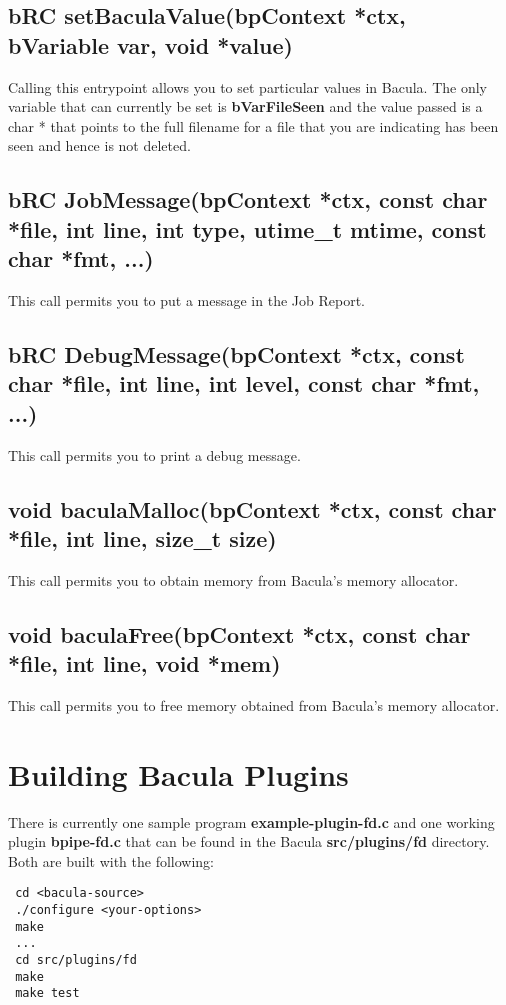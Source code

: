 \subsection{bRC setBaculaValue(bpContext *ctx, bVariable var, void *value)}
Calling this entrypoint allows you to set particular values in
Bacula. The only variable that can currently be set is
{\bf bVarFileSeen} and the value passed is a char * that points
to the full filename for a file that you are indicating has been
seen and hence is not deleted.

\subsection{bRC JobMessage(bpContext *ctx, const char *file, int line,
       int type, utime\_t mtime, const char *fmt, ...)}
This call permits you to put a message in the Job Report.


\subsection{bRC DebugMessage(bpContext *ctx, const char *file, int line,
       int level, const char *fmt, ...)}
This call permits you to print a debug message.


\subsection{void baculaMalloc(bpContext *ctx, const char *file, int line,
       size\_t size)}
This call permits you to obtain memory from Bacula's memory allocator.


\subsection{void baculaFree(bpContext *ctx, const char *file, int line, void *mem)}
This call permits you to free memory obtained from Bacula's memory allocator.

\section{Building Bacula Plugins}
There is currently one sample program {\bf example-plugin-fd.c} and
one working plugin {\bf bpipe-fd.c} that can be found in the Bacula
{\bf src/plugins/fd} directory.  Both are built with the following:

\begin{verbatim}
 cd <bacula-source>
 ./configure <your-options>
 make
 ...
 cd src/plugins/fd
 make
 make test
\end{verbatim}

